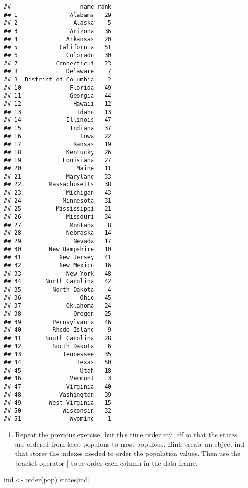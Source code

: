 \documentclass[
]{article}
\newenvironment{Shaded}{\begin{snugshade}}{\end{snugshade}}
\newcommand{\FunctionTok}[1]{\textcolor[rgb]{0.00,0.00,0.00}{#1}}
\newcommand{\NormalTok}[1]{#1}
\newcommand{\OtherTok}[1]{\textcolor[rgb]{0.56,0.35,0.01}{#1}}
\providecommand{\tightlist}{%
  \setlength{\itemsep}{0pt}\setlength{\parskip}{0pt}}
\begin{document}
\begin{verbatim}
##                    name rank
## 1               Alabama   29
## 2                Alaska    5
## 3               Arizona   36
## 4              Arkansas   20
## 5            California   51
## 6              Colorado   30
## 7           Connecticut   23
## 8              Delaware    7
## 9  District of Columbia    2
## 10              Florida   49
## 11              Georgia   44
## 12               Hawaii   12
## 13                Idaho   13
## 14             Illinois   47
## 15              Indiana   37
## 16                 Iowa   22
## 17               Kansas   19
## 18             Kentucky   26
## 19            Louisiana   27
## 20                Maine   11
## 21             Maryland   33
## 22        Massachusetts   38
## 23             Michigan   43
## 24            Minnesota   31
## 25          Mississippi   21
## 26             Missouri   34
## 27              Montana    8
## 28             Nebraska   14
## 29               Nevada   17
## 30        New Hampshire   10
## 31           New Jersey   41
## 32           New Mexico   16
## 33             New York   48
## 34       North Carolina   42
## 35         North Dakota    4
## 36                 Ohio   45
## 37             Oklahoma   24
## 38               Oregon   25
## 39         Pennsylvania   46
## 40         Rhode Island    9
## 41       South Carolina   28
## 42         South Dakota    6
## 43            Tennessee   35
## 44                Texas   50
## 45                 Utah   18
## 46              Vermont    3
## 47             Virginia   40
## 48           Washington   39
## 49        West Virginia   15
## 50            Wisconsin   32
## 51              Wyoming    1
\end{verbatim}

\begin{enumerate}
\def\labelenumi{\arabic{enumi}.}
\setcounter{enumi}{5}
\tightlist
\item
  Repeat the previous exercise, but this time order my\_df so that the
  states are ordered from least populous to most populous. Hint: create
  an object ind that stores the indexes needed to order the population
  values. Then use the bracket operator {[} to re-order each column in
  the data frame.
\end{enumerate}

\begin{Shaded}
\begin{Highlighting}[]
\NormalTok{ind }\OtherTok{\textless{}{-}} \FunctionTok{order}\NormalTok{(pop)}
\NormalTok{states[ind]}
\end{Highlighting}
\end{Shaded}
\end{document}
